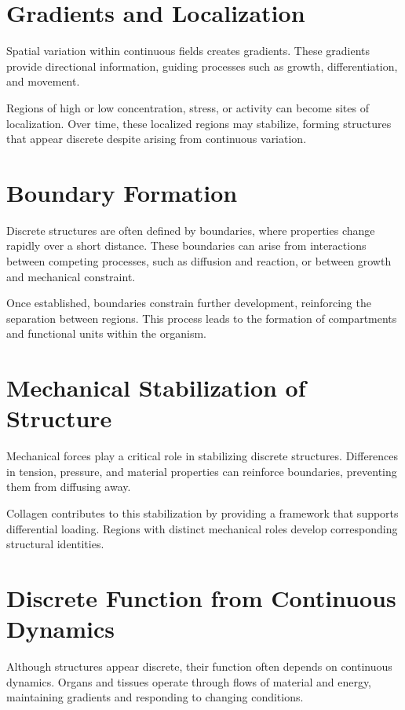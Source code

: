 \documentclass[11pt,oneside]{book}
\begin{document}
\section{Gradients and Localization}

Spatial variation within continuous fields creates gradients. These gradients provide directional information, guiding processes such as growth, differentiation, and movement.

Regions of high or low concentration, stress, or activity can become sites of localization. Over time, these localized regions may stabilize, forming structures that appear discrete despite arising from continuous variation.

\section{Boundary Formation}

Discrete structures are often defined by boundaries, where properties change rapidly over a short distance. These boundaries can arise from interactions between competing processes, such as diffusion and reaction, or between growth and mechanical constraint.

Once established, boundaries constrain further development, reinforcing the separation between regions. This process leads to the formation of compartments and functional units within the organism.

\section{Mechanical Stabilization of Structure}

Mechanical forces play a critical role in stabilizing discrete structures. Differences in tension, pressure, and material properties can reinforce boundaries, preventing them from diffusing away.

Collagen contributes to this stabilization by providing a framework that supports differential loading. Regions with distinct mechanical roles develop corresponding structural identities.

\section{Discrete Function from Continuous Dynamics}

Although structures appear discrete, their function often depends on continuous dynamics. Organs and tissues operate through flows of material and energy, maintaining gradients and responding to changing conditions.
\end{document}
